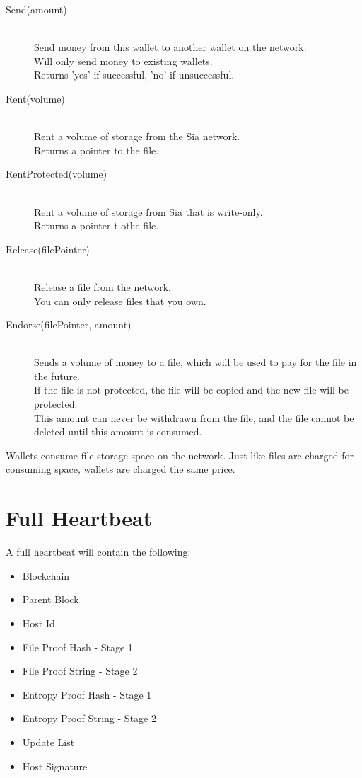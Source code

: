\documentclass[twocolumn]{article}
\begin{document}
\begin{description}
	\item[Send(amount)] \hfill \\
	Send money from this wallet to another wallet on the network. \\
	Will only send money to existing wallets. \\
	Returns 'yes' if successful, 'no' if unsuccessful.
	\item[Rent(volume)] \hfill \\
	Rent a volume of storage from the Sia network. \\
	Returns a pointer to the file.
	\item[RentProtected(volume)] \hfill \\
	Rent a volume of storage from Sia that is write-only. \\
	Returns a pointer t othe file.
	\item[Release(filePointer)] \hfill \\
	Release a file from the network. \\
	You can only release files that you own.
	\item[Endorse(filePointer, amount)] \hfill \\
	Sends a volume of money to a file, which will be used to pay for the file in the future. \\
	If the file is not protected, the file will be copied and the new file will be protected. \\
	This amount can never be withdrawn from the file, and the file cannot be deleted until this amount is consumed.
\end{description}

Wallets consume file storage space on the network.
Just like files are charged for consuming space, wallets are charged the same price.

\section{Full Heartbeat}

A full heartbeat will contain the following:

\begin{itemize}
	\item Blockchain
	\item Parent Block
	\item Host Id
	\item File Proof Hash - Stage 1
	\item File Proof String - Stage 2
	\item Entropy Proof Hash - Stage 1
	\item Entropy Proof String - Stage 2
	\item Update List
	\item Host Signature
\end{itemize}
\end{document}
